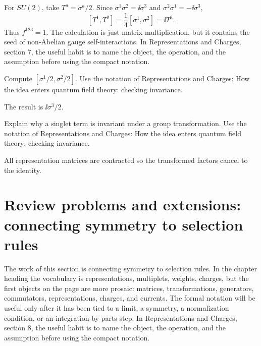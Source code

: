 \begin{example}
For \(SU(2)\), take \(T^a=\sigma^a/2\).  Since \(\sigma^1\sigma^2=\ii\sigma^3\) and \(\sigma^2\sigma^1=-\ii\sigma^3\),
\[
  [T^1,T^2]=\frac14[\sigma^1,\sigma^2]=\ii T^3.
\]
Thus \(f^{123}=1\).  The calculation is just matrix multiplication, but it contains the seed of non-Abelian gauge self-interactions.  In Representations and Charges, section 7, the useful habit is to name the object, the operation, and the assumption before using the compact notation.
\end{example}



\begin{exercise}
Compute \([\sigma^1/2,\sigma^2/2]\).  Use the notation of Representations and Charges: How the idea enters quantum field theory: checking invariance.
\begin{answer}
The result is \(\ii\sigma^3/2\).
\end{answer}
\end{exercise}

\begin{exercise}
Explain why a singlet term is invariant under a group transformation.  Use the notation of Representations and Charges: How the idea enters quantum field theory: checking invariance.
\begin{answer}
All representation matrices are contracted so the transformed factors cancel to the identity.
\end{answer}
\end{exercise}



\section{Review problems and extensions: connecting symmetry to selection rules}

The work of this section is connecting symmetry to selection rules.  In the chapter heading the vocabulary is representations, multiplets, weights, charges, but the first objects on the page are more prosaic: matrices, transformations, generators, commutators, representations, charges, and currents.  The formal notation will be useful only after it has been tied to a limit, a symmetry, a normalization condition, or an integration-by-parts step.  In Representations and Charges, section 8, the useful habit is to name the object, the operation, and the assumption before using the compact notation.


